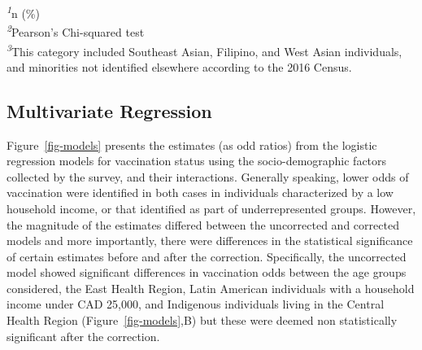 \documentclass[
]{article}
\begin{document}
\begin{minipage}{\linewidth}
\textsuperscript{\textit{1}}n (\%)\\
\textsuperscript{\textit{2}}Pearson's Chi-squared test\\
\textsuperscript{\textit{3}}This category included Southeast Asian, Filipino, and West Asian individuals,
and minorities not identified elsewhere according to the 2016 Census.\\
\end{minipage}

\hypertarget{multivariate-regression}{%
\subsection{Multivariate Regression}\label{multivariate-regression}}

Figure~\ref{fig-models} presents the estimates (as odd ratios) from the
logistic regression models for vaccination status using the
socio-demographic factors collected by the survey, and their
interactions. Generally speaking, lower odds of vaccination were
identified in both cases in individuals characterized by a low household
income, or that identified as part of underrepresented groups. However,
the magnitude of the estimates differed between the uncorrected and
corrected models and more importantly, there were differences in the
statistical significance of certain estimates before and after the
correction. Specifically, the uncorrected model showed significant
differences in vaccination odds between the age groups considered, the
East Health Region, Latin American individuals with a household income
under CAD 25,000, and Indigenous individuals living in the Central
Health Region (Figure~\ref{fig-models},B) but these were deemed non
statistically significant after the correction.
\end{document}
